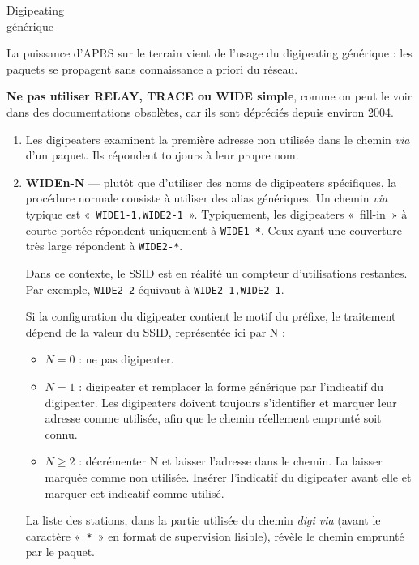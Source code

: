 \begin{aprssideblock}{Digipeating\\générique}
\label{digipeating-guxe9nuxe9rique}
La puissance d'APRS sur le terrain vient de l'usage du digipeating
générique : les paquets se propagent sans connaissance a priori du
réseau.

\textbf{Ne pas utiliser RELAY, TRACE ou WIDE simple}, comme on peut le
voir dans des documentations obsolètes, car ils sont dépréciés depuis
environ 2004.

\begin{enumerate}
\def\labelenumi{\arabic{enumi}.}
\tightlist
\item
  Les digipeaters examinent la première adresse non utilisée dans le
  chemin \emph{via} d'un paquet. Ils répondent toujours à leur propre
  nom.
\item
  \textbf{WIDEn-N} --- plutôt que d'utiliser des noms de digipeaters
  spécifiques, la procédure normale consiste à utiliser des alias
  génériques. Un chemin \emph{via} typique est
  «~\texttt{WIDE1-1,WIDE2-1}~». Typiquement, les digipeaters «~fill-in~»
  à courte portée répondent uniquement à \texttt{WIDE1-*}. Ceux ayant
  une couverture très large répondent à \texttt{WIDE2-*}.

  Dans ce contexte, le SSID est en réalité un compteur d'utilisations
  restantes. Par exemple, \texttt{WIDE2-2} équivaut à
  \texttt{WIDE2-1,WIDE2-1}.

  Si la configuration du digipeater contient le motif du préfixe, le
  traitement dépend de la valeur du SSID, représentée ici par N :

  \begin{itemize}
  \tightlist
  \item
    $N = 0$ : ne pas digipeater.
  \item
    $N = 1$ : digipeater et remplacer la forme générique par
    l'indicatif du digipeater. Les digipeaters doivent toujours
    s'identifier et marquer leur adresse comme utilisée, afin que le
    chemin réellement emprunté soit connu.
  \item
    $N \ge 2$ : décrémenter N et laisser l'adresse dans le chemin. La
    laisser marquée comme non utilisée. Insérer l'indicatif du
    digipeater avant elle et marquer cet indicatif comme utilisé.
  \end{itemize}

  La liste des stations, dans la partie utilisée du chemin \emph{digi
  via} (avant le caractère «~\texttt{*}~» en format de supervision
  lisible), révèle le chemin emprunté par le paquet.


\end{enumerate}
\end{aprssideblock}
